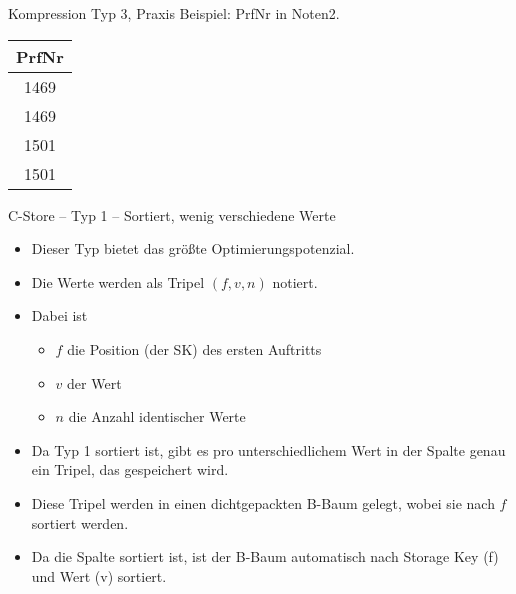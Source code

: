 \begin{frame}{Kompression Typ 3, Praxis}
\only<+->{}
Beispiel: PrfNr in Noten2.

\vspace{4mm}
\begin{tabular}{|c|}
	\hline
	PrfNr \\ \hline
	1469  \\ \hline
	1469  \\ \hline
	1501  \\ \hline
	1501  \\ \hline
\end{tabular}
\end{frame}

\begin{frame}{C-Store -- Typ 1 -- Sortiert, wenig verschiedene Werte}

\begin{itemize}[<+->]
	\item Dieser Typ bietet das gr\"o\ss{}te Optimierungspotenzial.
	\item Die Werte werden als Tripel $(f,v,n)$ notiert.
	\item Dabei ist 
\begin{itemize}
	\item $f$ die Position (der SK) des ersten Auftritts
	\item $v$ der Wert 
	\item $n$ die Anzahl identischer Werte
\end{itemize}
	\item Da Typ 1 sortiert ist, gibt es pro unterschiedlichem Wert in der Spalte genau ein Tripel, das gespeichert wird.
	\item Diese Tripel werden in einen dichtgepackten B-Baum gelegt, wobei sie nach $f$ sortiert werden.
	\item  Da die Spalte sortiert ist, ist der B-Baum automatisch nach Storage Key (f) und Wert (v) sortiert.
\end{itemize}

\end{frame}

